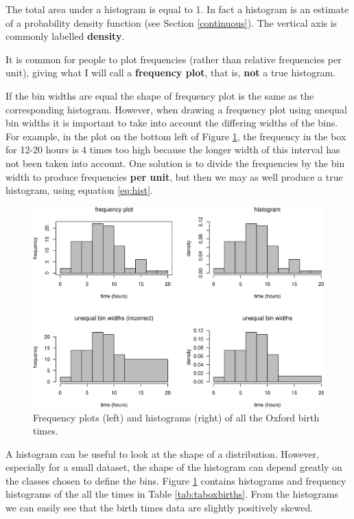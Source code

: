\documentclass[
  british,
]{book}
\begin{document}
The total area under a histogram is equal to 1. In fact a histogram is an estimate of a probability density function (see Section \ref{continuous}). The vertical axis is commonly labelled \textbf{density}.

It is common for people to plot frequencies (rather than relative frequencies per unit), giving what I will call a \textbf{frequency plot}, that is, \textbf{not} a true histogram.

If the bin widths are equal the shape of frequency plot is the same as the corresponding histogram. However, when drawing a frequency plot using unequal bin widths it is important to take into account the differing widths of the bins. For example, in the plot on the bottom left of Figure \ref{fig:oxhistbasic}, the frequency in the box for 12-20 hours is 4 times too high because the longer width of this interval has not been taken into account.
One solution is to divide the frequencies by the bin width to produce frequencies \textbf{per unit}, but then we may as well produce a true histogram, using equation \eqref{eq:hist}.

\begin{figure}

{\centering \includegraphics[width=0.8\linewidth]{images/ox_hist_basic} 

}

\caption{Frequency plots (left) and histograms (right) of all the Oxford birth times.}\label{fig:oxhistbasic}
\end{figure}
\FloatBarrier

A histogram can be useful to look at the shape of a distribution. However,
especially for a small dataset, the shape of the histogram can depend greatly on the classes chosen to define the bins. Figure \ref{fig:oxhistbasic} contains histograms and frequency histograms of the all the times in Table \ref{tab:taboxbirths}. From the histograms we can easily see that the birth times data are slightly positively skewed.
\end{document}
